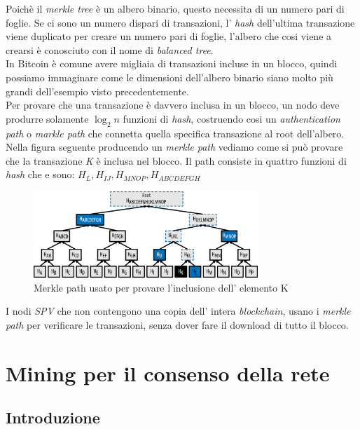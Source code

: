 Poich\`e il \textit{merkle tree} \`e un albero binario, questo necessita di un numero pari di foglie. Se ci sono un numero dispari di transazioni, l' \textit{hash} dell'ultima transazione viene duplicato per creare un numero pari di foglie, l'albero che cosi viene a crearsi \`e conosciuto con il nome di \textit{balanced tree}.\\
In Bitcoin \`e comune avere migliaia di transazioni incluse in un blocco, quindi possiamo immaginare come le dimensioni dell'albero binario siano molto pi\`u grandi dell'esempio visto precedentemente.\\
Per provare che una transazione \`e davvero inclusa in un blocco, un nodo deve produrre solamente $\log_2{n}$ funzioni di \textit{hash}, costruendo cosi un \textit{authentication path} o \textit{markle path} che connetta quella specifica transazione al root dell'albero.\\
Nella figura seguente producendo un \textit{merkle path} vediamo come si pu\`o provare che la transazione \textit{K} \`e inclusa nel blocco. Il path consiste in quattro funzioni di \textit{hash} che e sono: $H_L,H_{IJ},H_{MNOP},H_{ABCDEFGH}$
\begin{figure}[htb]
\begin{center}
   \includegraphics[width=0.755\textwidth]{imgs/merkleProof.png}
   \caption{Merkle path usato per provare l'inclusione dell' elemento K}
   \end{center}
   \hfill
\end{figure}
I nodi \textit{SPV} che non contengono una copia dell' intera \textit{blockchain}, usano i \textit{merkle path} per verificare le transazioni, senza dover fare il download di tutto il blocco.



\section{Mining per il consenso della rete}
\subsection{Introduzione}

